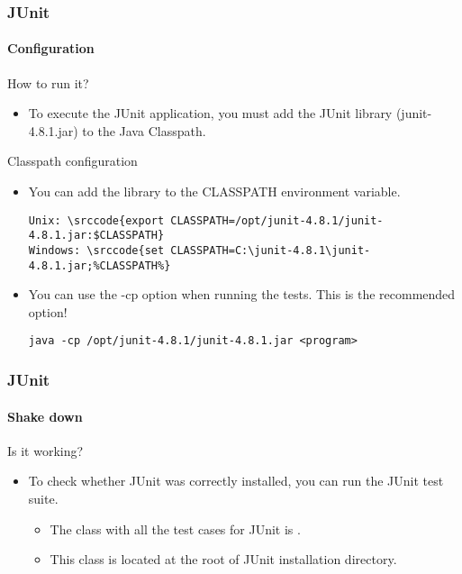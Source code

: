 \begin{frame}[fragile]
\frametitle{JUnit}
\framesubtitle{Configuration}
\label{procedure:junit:configuration}

\begin{block:fact}{How to run it?}
\begin{itemize}
	\item To execute the JUnit application, you must add the JUnit library
	(junit-4.8.1.jar) to the Java Classpath.
\end{itemize}
\end{block:fact}

\begin{block:fact}{Classpath configuration}
\begin{itemize}
	\item You can add the library to the CLASSPATH environment variable.
\begin{lstlisting}
Unix: \srccode{export CLASSPATH=/opt/junit-4.8.1/junit-4.8.1.jar:$CLASSPATH}
Windows: \srccode{set CLASSPATH=C:\junit-4.8.1\junit-4.8.1.jar;%CLASSPATH%}
\end{lstlisting}

	\item You can use the -cp option when running the tests. This is the
	recommended option!
\begin{lstlisting}
java -cp /opt/junit-4.8.1/junit-4.8.1.jar <program>
\end{lstlisting}
\end{itemize}
\end{block:fact}
\end{frame}



\begin{frame}[hasprev=true, hasnext=false]
\frametitle{JUnit}
\framesubtitle{Shake down}
\label{procedure:junit:shakedown}


\begin{block:fact}{Is it working?}
\begin{itemize}
	\item To check whether JUnit was correctly installed, you can run the JUnit
	test suite.
	\begin{itemize}
		\item The class with all the test cases for JUnit is
		.

		\item This class is located at the root of JUnit installation directory.
	\end{itemize}
\end{itemize}
\end{block:fact}


\hfill
{}
\end{frame}


